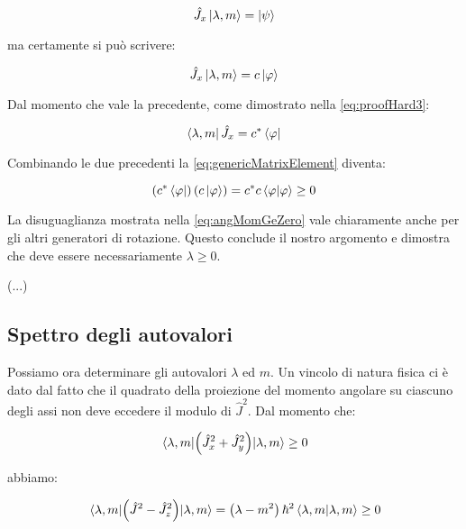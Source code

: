 	\begin{equation}
		\hat{J}_x \ket{\lambda, m} = \ket{\psi}
	\end{equation}

ma certamente si pu\`o scrivere:

	\begin{equation}
		\hat{J}_x \ket{\lambda, m} = c \ket{\varphi}
	\end{equation}

Dal momento che vale la precedente, come dimostrato nella \eqref{eq:proofHard3}:

	\begin{equation}
		\bra{\lambda, m} \hat{J}_x = c^* \bra{\varphi}
	\end{equation}

Combinando le due precedenti la \eqref{eq:genericMatrixElement} diventa:

	\begin{equation} \label{eq:angMomGeZero}
		\left ( c^* \bra{\varphi} \right ) \left ( c \ket{\varphi} \right ) = c^*c \braket{\varphi}{\varphi} \ge 0
	\end{equation}

La disuguaglianza mostrata nella \eqref{eq:angMomGeZero} vale chiaramente anche per gli altri generatori di rotazione. Questo conclude il nostro argomento e dimostra che deve essere necessariamente $\lambda \ge 0$.

(...)

\subsection{Spettro degli autovalori}

Possiamo ora determinare gli autovalori $\lambda$ ed $m$. Un vincolo di natura fisica ci \`e dato dal fatto che il quadrato della proiezione del momento angolare su ciascuno degli assi non deve eccedere il modulo di $\hat{J}^2$. Dal momento che:

	\begin{equation}
		\mel{\lambda, m}{\left ( \hat{J}^2_x + \hat{J}^2_y \right )}{\lambda, m} \ge 0
	\end{equation}

abbiamo:

	\begin{equation}
		\mel{\lambda, m}{\left ( \hat{J}^2 - \hat{J}^2_z \right )}{\lambda, m} = \left ( \lambda - m^2 \right ) \hbar^2 \braket{\lambda, m}{\lambda, m} \ge 0
	\end{equation}

